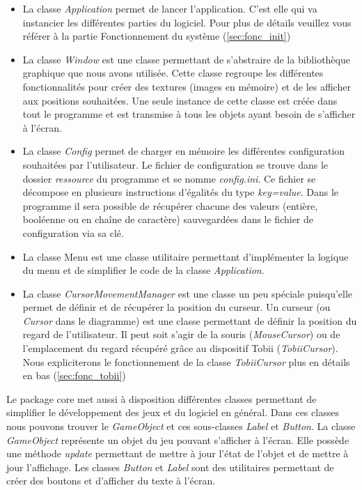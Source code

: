 \documentclass{polytech/polytech}
\begin{document}
\begin{itemize}
\item La classe \textit{Application} permet de lancer l'application. C'est elle qui va instancier les différentes parties du logiciel. Pour plus de détails veuillez vous référer à la partie Fonctionnement du système (\autoref{sec:fonc_init})
\item La classe \textit{Window} est une classe permettant de s'abstraire de la bibliothèque graphique que nous avons utilisée. Cette classe regroupe les différentes fonctionnalités pour créer des textures (images en mémoire) et de les afficher aux positions souhaitées. Une seule instance de cette classe est créée dans tout le programme et est transmise à tous les objets ayant besoin de  s'afficher à l'écran. 
\item La classe \textit{Config} permet de charger en mémoire les différentes configuration souhaitées par l'utilisateur. Le fichier de configuration se trouve dans le dossier \textit{ressource} du programme et se nomme \textit{config.ini}. Ce fichier se décompose en plusieurs instructions d'égalités du type \textit{key=value}. Dans le programme il sera possible de récupérer chacune des valeurs (entière, booléenne ou en chaîne de caractère) sauvegardées dans le fichier de configuration via sa clé. 
\item La classe {Menu} est une classe utilitaire permettant d'implémenter la logique du menu et de simplifier le code de la classe \textit{Application}.
\item La classe \textit{CursorMovementManager} est une classe un peu spéciale puisqu'elle permet de définir et de récupérer la position du curseur. Un curseur (ou \textit{Cursor} dans le diagramme) est une classe permettant de définir la position du regard de l'utilisateur. Il peut soit s'agir de la  souris (\textit{MouseCursor}) ou de l'emplacement du regard récupéré grâce au dispositif Tobii (\textit{TobiiCursor}). Nous expliciterons le fonctionnement de la classe \textit{TobiiCursor} plus en détails en bas (\autoref{sec:fonc_tobii})
\end{itemize}

Le package {core} met aussi à disposition différentes classes permettant de simplifier le développement des jeux et du logiciel en général. Dans ces classes nous pouvons trouver le \textit{GameObject} et ces sous-classes \textit{Label} et \textit{Button}. La classe \textit{GameObject} représente un objet du jeu pouvant s'afficher à l'écran. Elle possède une méthode \textit{update} permettant de mettre à jour l'état de l'objet et de mettre à jour l'affichage. 
Les classes \textit{Button} et \textit{Label} sont des utilitaires permettant de créer des boutons et d'afficher du texte à l'écran.
\end{document}
